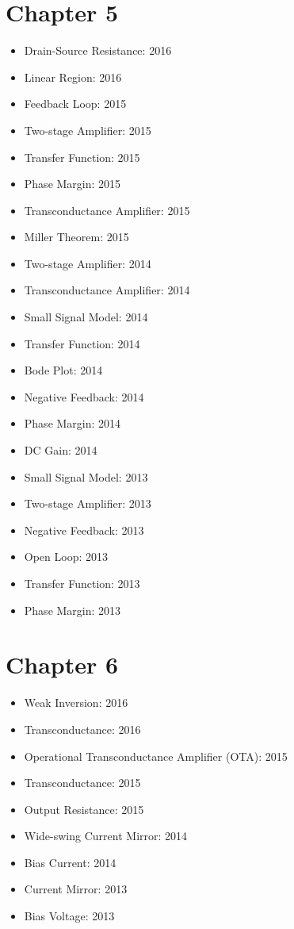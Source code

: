 \documentclass[twocolumn]{article}
\begin{document}
  \section*{Chapter 5}
    \begin{itemize}
      \item Drain-Source Resistance: 2016
      \item Linear Region: 2016

      \item Feedback Loop: 2015
      \item Two-stage Amplifier: 2015
      \item Transfer Function: 2015
      \item Phase Margin: 2015
      \item Transconductance Amplifier: 2015
      \item Miller Theorem: 2015

      \item Two-stage Amplifier: 2014
      \item Transconductance Amplifier: 2014
      \item Small Signal Model: 2014
      \item Transfer Function: 2014
      \item Bode Plot: 2014
      \item Negative Feedback: 2014
      \item Phase Margin: 2014
      \item DC Gain: 2014

      \item Small Signal Model: 2013
      \item Two-stage Amplifier: 2013
      \item Negative Feedback: 2013
      \item Open Loop: 2013
      \item Transfer Function: 2013
      \item Phase Margin: 2013
    \end{itemize}
  \section*{Chapter 6}
    \begin{itemize}
      \item Weak Inversion: 2016
      \item Transconductance: 2016

      \item Operational Transconductance Amplifier (OTA): 2015
      \item Transconductance: 2015
      \item Output Resistance: 2015

      \item Wide-swing Current Mirror: 2014
      \item Bias Current: 2014

      \item Current Mirror: 2013
      \item Bias Voltage: 2013
    \end{itemize}
\end{document}

